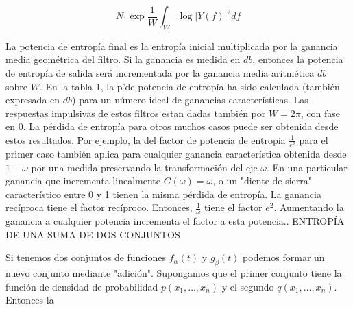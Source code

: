 \begin{equation}
N_{1}\exp \frac{1}{W}\int_{W}^{\:}\log \left | Y\left ( f \right ) \right |^{2}df
\end{equation}

La potencia de entrop\'ia final es la entrop\'ia inicial multiplicada por la ganancia media geom\'etrica del filtro. Si la ganancia es medida en $db$, entonces la potencia de entrop\'ia de salida ser\'a incrementada por la ganancia media aritm\'etica $db$ sobre $W$.\newline
En la tabla 1, la p'\erdida de potencia de entrop\'ia ha sido calculada (tambi\'en expresada en $db$) para un n\'umero ideal de ganancias caracter\'isticas. Las respuestas impulsivas de estos filtros estan dadas tambi\'en por $W = 2 \pi$, con fase en 0.\newline
La p\'erdida de entrop\'ia para otros muchos casos puede ser obtenida desde estos resultados. Por ejemplo, la del factor de potencia de entrop\;ia $\frac{1}{e^{2}}$ para el primer caso tambi\'en aplica para cualquier ganancia caracter\'istica obtenida desde $1-\omega$ por una medida preservando la transformaci\'on del eje $\omega$. En una particular ganancia que incrementa linealmente $G \left (\omega  \right) = \omega$, o un "diente de sierra" caracter\'istico entre 0 y 1 tienen la misma p\'erdida de entrop\'ia. La ganancia rec\'iproca tiene el factor rec\'iproco. Entonces, $\frac{1}{\omega}$ tiene el factor $e^{2}$. Aumentando la ganancia a cualquier potencia incrementa el factor a esta potencia.\newline \newline {}. ENTROP\'IA DE UNA SUMA DE DOS CONJUNTOS\newline 

Si tenemos dos conjuntos de funciones $f_{\alpha} \left( t \right)$ y $g_{\beta} \left( t \right)$ podemos formar un nuevo conjunto mediante "adici\'on". Supongamos que el primer conjunto  tiene la funci\'on de densidad de probabilidad $p \left( x_{1}, \dots , x_{n} \right)$ y el segundo $q \left( x_{1}, \dots , x_{n} \right)$. Entonces la

